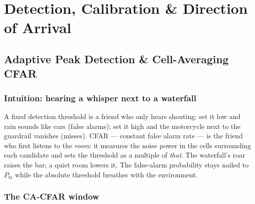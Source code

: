 \documentclass[11pt,oneside]{book}
\begin{document}
\part{Detection, Calibration \& Direction of Arrival}

\chapter{Adaptive Peak Detection \& Cell-Averaging CFAR}
\label{ch:cfar}

\section{Intuition: hearing a whisper next to a waterfall}
\label{sec:waterfall}

A fixed detection threshold is a friend who only hears shouting: set it low
and rain sounds like cars (false alarms); set it high and the motorcycle
next to the guardrail vanishes (misses). CFAR --- constant false alarm rate
--- is the friend who first listens to the \emph{room}: it measures the
noise power in the cells surrounding each candidate and sets the threshold
as a multiple of \emph{that}. The waterfall's roar raises the bar; a quiet
room lowers it. The false-alarm probability stays nailed to $P_{\mathrm{fa}}$
while the absolute threshold breathes with the environment.

\section{The CA-CFAR window}
\label{sec:ca-cfar}
\end{document}

